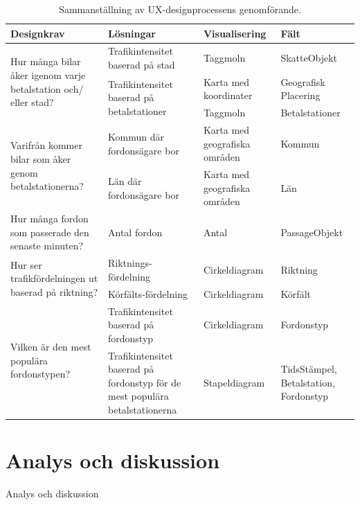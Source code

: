 \documentclass{kththesis}
\begin{document}
\begin{table}[h!]
  \begin{center}
  \caption{Sammanställning av UX-designprocessens genomförande.}
    \label{tab:table1}
 \begin{tabular}{|p{3cm}|p{3cm}|p{3cm}|p{3cm}|}
      \hline
     \textbf{Designkrav} & \textbf{Lösningar} & \textbf{Visualisering} & \textbf{Fält}\\
     \hline
  \multirow{3}{3cm}{Hur många bilar åker igenom varje betalstation och/ eller stad?} &  Trafikintensitet baserad på stad & Taggmoln  & SkatteObjekt\\\cline{2-4}
  & \multirow{2}{3cm}{Trafikintensitet baserad på betalstationer} & Karta med koordinater
& Geografisk Placering\\\cline{3-4}  
  & &  Taggmoln
& Betalstationer \\ \hline


  \multirow{2}{3cm}{Varifrån kommer bilar som åker genom betalstationerna?} &  Kommun där fordonsägare bor & Karta med geografiska områden  & Kommun\\\cline{2-4}
  &Län där fordonsägare bor
 & Karta med geografiska områden  & Län\\ \hline
 
Hur många fordon som passerade den senaste minuten? &Antal fordon
 & Antal  & PassageObjekt\\ \hline
 
 \multirow{2}{3cm}{Hur ser trafikfördelningen ut baserad på riktning?} &  Riktnings-fördelning&Cirkeldiagram& Riktning\\\cline{2-4}
  &Körfälts-fördelning 
 & Cirkeldiagram  & Körfält\\ \hline
 
 \multirow{2}{3cm}{Vilken är den mest populära fordonstypen?} &  Trafikintensitet baserad på fordonstyp & Cirkeldiagram& Fordonstyp\\\cline{2-4}
  &Trafikintensitet baserad på fordonstyp för de mest populära betalstationerna 
 & Stapeldiagram  & TidsStämpel, Betalstation, Fordonstyp\\ \hline


\end{tabular}
\end{center}
\end{table}

\chapter{Analys och diskussion}
Analys och diskussion
\blindtext
\end{document}
